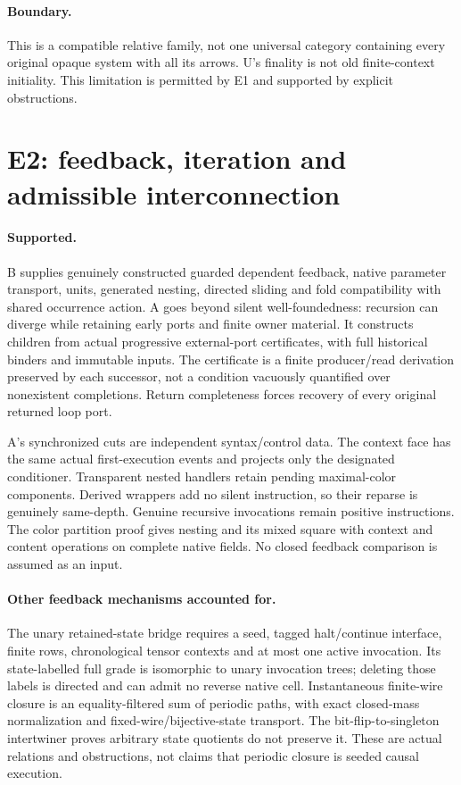 \documentclass[11pt]{article}
\begin{document}
\paragraph{Boundary.} This is a compatible relative family, not one universal category containing every original opaque system with all its arrows. U's finality is not old finite-context initiality. This limitation is permitted by E1 and supported by explicit obstructions.

\section{E2: feedback, iteration and admissible interconnection}
\paragraph{Supported.} B supplies genuinely constructed guarded dependent feedback, native parameter transport, units, generated nesting, directed sliding and fold compatibility with shared occurrence action. A goes beyond silent well-foundedness: recursion can diverge while retaining early ports and finite owner material. It constructs children from actual progressive external-port certificates, with full historical binders and immutable inputs. The certificate is a finite producer/read derivation preserved by each successor, not a condition vacuously quantified over nonexistent completions. Return completeness forces recovery of every original returned loop port.

A's synchronized cuts are independent syntax/control data. The context face has the same actual first-execution events and projects only the designated conditioner. Transparent nested handlers retain pending maximal-color components. Derived wrappers add no silent instruction, so their reparse is genuinely same-depth. Genuine recursive invocations remain positive instructions. The color partition proof gives nesting and its mixed square with context and content operations on complete native fields. No closed feedback comparison is assumed as an input.

\paragraph{Other feedback mechanisms accounted for.} The unary retained-state bridge requires a seed, tagged halt/continue interface, finite rows, chronological tensor contexts and at most one active invocation. Its state-labelled full grade is isomorphic to unary invocation trees; deleting those labels is directed and can admit no reverse native cell. Instantaneous finite-wire closure is an equality-filtered sum of periodic paths, with exact closed-mass normalization and fixed-wire/bijective-state transport. The bit-flip-to-singleton intertwiner proves arbitrary state quotients do not preserve it. These are actual relations and obstructions, not claims that periodic closure is seeded causal execution.
\end{document}
